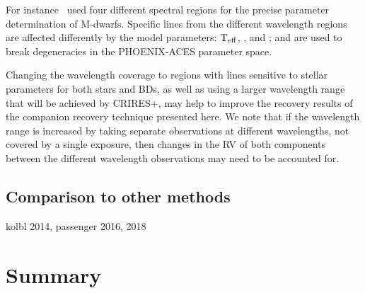 For instance~\citet{passegger_fundamental_2016} used four different spectral regions for the precise parameter determination of M-dwarfs.
Specific lines from the different wavelength regions are affected differently by the model parameters: \(\textrm{T}_{\mathrm{eff}}{}\), \logg{}, and \feh{}; and are used to break degeneracies in the {PHOENIX-ACES} parameter space.

Changing the wavelength coverage to regions with lines sensitive to stellar parameters for both stars and BDs, as well as using a larger wavelength range that will be achieved by {CRIRES+}, may help to improve the recovery results of the companion recovery technique presented here.
We note that if the wavelength range is increased by taking separate observations at different wavelengths, not covered by a single exposure, then changes in the {RV} of both components between the different wavelength observations may need to be accounted for.



\subsection{Comparison to other methods}
kolbl 2014, passenger 2016, 2018




\section{Summary}
